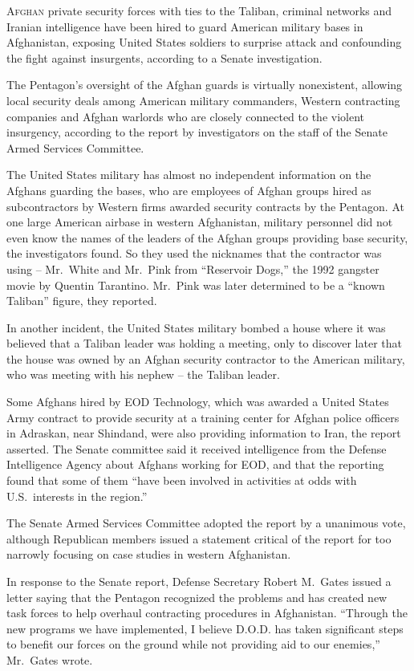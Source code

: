 ﻿\documentclass[12pt]{article}
\begin{document}
\lettrine{A}{fghan} private security forces with ties to the Taliban,
criminal networks and Iranian intelligence have been hired to guard American military bases in
Afghanistan, exposing United States soldiers to surprise attack and confounding the fight against
insurgents, according to a Senate investigation.

The Pentagon's oversight of the Afghan guards is virtually nonexistent, allowing local security
deals among American military commanders, Western contracting companies and Afghan warlords who are
closely connected to the violent insurgency, according to the report by investigators on the staff
of the Senate Armed Services Committee.

The United States military has almost no independent information on the Afghans guarding the bases,
who are employees of Afghan groups hired as subcontractors by Western firms awarded security
contracts by the Pentagon. At one large American airbase in western Afghanistan, military personnel
did not even know the names of the leaders of the Afghan groups providing base security, the
investigators found. So they used the nicknames that the contractor was using -- Mr.~White and
Mr.~Pink from ``Reservoir Dogs,'' the 1992 gangster movie by Quentin Tarantino. Mr.~Pink was later
determined to be a ``known Taliban'' figure, they reported.

In another incident, the United States military bombed a house where it was believed that a Taliban
leader was holding a meeting, only to discover later that the house was owned by an Afghan security
contractor to the American military, who was meeting with his nephew -- the Taliban leader.

Some Afghans hired by EOD Technology, which was awarded a United States Army contract to provide
security at a training center for Afghan police officers in Adraskan, near Shindand, were also
providing information to Iran, the report asserted. The Senate committee said it received
intelligence from the Defense Intelligence Agency about Afghans working for EOD, and that the
reporting found that some of them ``have been involved in activities at odds with U.S.~interests in
the region.''

The Senate Armed Services Committee adopted the report by a unanimous vote, although Republican
members issued a statement critical of the report for too narrowly focusing on case studies in
western Afghanistan.

In response to the Senate report, Defense Secretary Robert M.~Gates issued a letter saying that the
Pentagon recognized the problems and has created new task forces to help overhaul contracting
procedures in Afghanistan. ``Through the new programs we have implemented, I believe D.O.D. has
taken significant steps to benefit our forces on the ground while not providing aid to our
enemies,'' Mr.~Gates wrote.
\end{document}
